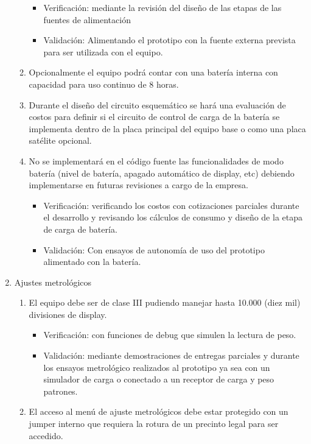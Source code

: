 \documentclass[11pt]{charter}
\begin{document}
\begin{enumerate}
\begin{enumerate}
\begin{itemize}
\item Verificación: mediante la revisión del diseño de las etapas de las fuentes de alimentación
\item Validación: Alimentando el prototipo con la fuente externa prevista para ser utilizada con el equipo.
\end{itemize}		
	
	\item Opcionalmente el equipo podrá contar con una batería interna con capacidad para uso continuo de 8 horas.
	\item Durante el diseño del circuito esquemático se hará una evaluación de costos para definir si el circuito de control de carga de la batería se implementa dentro de la placa principal del equipo base o como una placa satélite opcional.
		\item No se implementará en el código fuente las funcionalidades de modo batería (nivel de batería, apagado automático de display, etc) debiendo implementarse en futuras revisiones a cargo de la empresa. 
	
\begin{itemize}
\item Verificación: verificando los costos con cotizaciones parciales durante el desarrollo y revisando los cálculos de consumo y diseño de la etapa de carga de batería.
\item Validación: Con ensayos de autonomía de uso del prototipo alimentado con la batería.
\end{itemize}	
	\end{enumerate}

\item Ajustes metrológicos
	\begin{enumerate}
	\item El equipo debe ser de clase III pudiendo manejar hasta 10.000 (diez mil) divisiones de display.
	
\begin{itemize}
\item Verificación: con funciones de debug que simulen la lectura de peso.
\item Validación: mediante demostraciones de entregas parciales y durante los ensayos metrológico realizados al prototipo ya sea con un simulador de carga o conectado a un receptor de carga y peso patrones.
\end{itemize}		
	
	\item El acceso al menú de ajuste metrológicos debe estar protegido con un jumper interno que requiera la rotura de un precinto legal para ser accedido.
	

\end{enumerate}
\end{enumerate}
\end{document}

